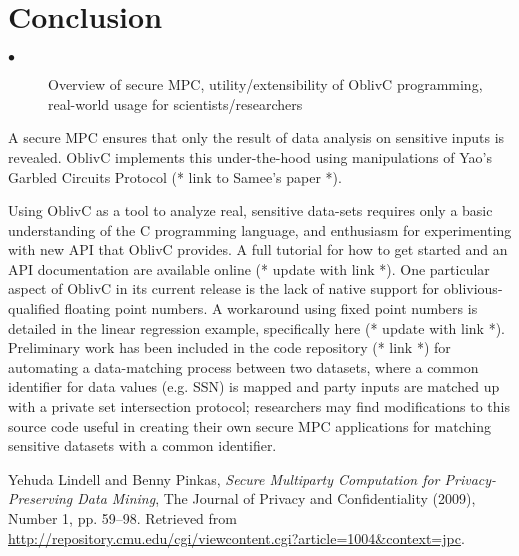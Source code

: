 \documentclass{article}
\begin{document}
\section{Conclusion}
\begin{description}
\item[$\bullet$] Overview of secure MPC, utility/extensibility of OblivC programming, real-world usage for scientists/researchers
\end{description}

A secure MPC ensures that only the result of data analysis on sensitive inputs is revealed. OblivC implements this under-the-hood using manipulations of Yao's Garbled
Circuits Protocol (* link to Samee's paper *).

Using OblivC as a tool to analyze real, sensitive data-sets requires only a basic understanding of the C programming language, and enthusiasm for experimenting with new API that
OblivC provides. A full tutorial for how to get started and an API documentation are available online (* update with link *). One particular aspect of OblivC in its current release is the lack of native
support for oblivious-qualified floating point numbers. A workaround using fixed point numbers is detailed in the linear regression example, specifically here (* update with link *). Preliminary work has been included in the code repository (* link *) for automating a data-matching process between two datasets, where a common identifier for data values (e.g. SSN) is mapped and party inputs are
matched up with a private set intersection protocol; researchers may find modifications to this source code useful in creating their own secure MPC applications for matching sensitive datasets
with a common identifier. 



\begin{thebibliography}{9} %

  Yehuda Lindell and Benny Pinkas,
  \emph{Secure Multiparty Computation for
Privacy-Preserving Data Mining},
  The Journal of Privacy and Confidentiality (2009),
  Number 1, pp. 59–98. Retrieved from \href{http://repository.cmu.edu/cgi/viewcontent.cgi?article=1004\&context=jpc}{http://repository.cmu.edu/cgi/viewcontent.cgi?article=1004\&context=jpc}. 

\end{thebibliography}
\end{document}
